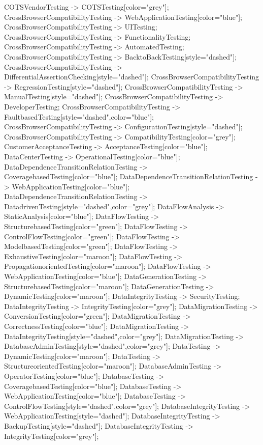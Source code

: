 \documentclass{article}
\begin{document}
{COTSVendorTesting -> COTSTesting[color="grey"];
CrossBrowserCompatibilityTesting -> WebApplicationTesting[color="blue"];
CrossBrowserCompatibilityTesting -> UITesting;
CrossBrowserCompatibilityTesting -> FunctionalityTesting;
CrossBrowserCompatibilityTesting -> AutomatedTesting;
CrossBrowserCompatibilityTesting -> BacktoBackTesting[style="dashed"];
CrossBrowserCompatibilityTesting -> DifferentialAssertionChecking[style="dashed"];
CrossBrowserCompatibilityTesting -> RegressionTesting[style="dashed"];
CrossBrowserCompatibilityTesting -> ManualTesting[style="dashed"];
CrossBrowserCompatibilityTesting -> DeveloperTesting;
CrossBrowserCompatibilityTesting -> FaultbasedTesting[style="dashed",color="blue"];
CrossBrowserCompatibilityTesting -> ConfigurationTesting[style="dashed"];
CrossBrowserCompatibilityTesting -> CompatibilityTesting[color="grey"];
CustomerAcceptanceTesting -> AcceptanceTesting[color="blue"];
DataCenterTesting -> OperationalTesting[color="blue"];
DataDependenceTransitionRelationTesting -> CoveragebasedTesting[color="blue"];
DataDependenceTransitionRelationTesting -> WebApplicationTesting[color="blue"];
DataDependenceTransitionRelationTesting -> DatadrivenTesting[style="dashed",color="grey"];
DataFlowAnalysis -> StaticAnalysis[color="blue"];
DataFlowTesting -> StructurebasedTesting[color="green"];
DataFlowTesting -> ControlFlowTesting[color="green"];
DataFlowTesting -> ModelbasedTesting[color="green"];
DataFlowTesting -> ExhaustiveTesting[color="maroon"];
DataFlowTesting -> PropagationorientedTesting[color="maroon"];
DataFlowTesting -> WebApplicationTesting[color="blue"];
DataGenerationTesting -> StructurebasedTesting[color="maroon"];
DataGenerationTesting -> DynamicTesting[color="maroon"];
DataIntegrityTesting -> SecurityTesting;
DataIntegrityTesting -> IntegrityTesting[color="grey"];
DataMigrationTesting -> ConversionTesting[color="green"];
DataMigrationTesting -> CorrectnessTesting[color="blue"];
DataMigrationTesting -> DataIntegrityTesting[style="dashed",color="grey"];
DataMigrationTesting -> DatabaseAdminTesting[style="dashed",color="grey"];
DataTesting -> DynamicTesting[color="maroon"];
DataTesting -> StructureorientedTesting[color="maroon"];
DatabaseAdminTesting -> OperatorTesting[color="blue"];
DatabaseTesting -> CoveragebasedTesting[color="blue"];
DatabaseTesting -> WebApplicationTesting[color="blue"];
DatabaseTesting -> ControlFlowTesting[style="dashed",color="grey"];
DatabaseIntegrityTesting -> WebApplicationTesting[style="dashed"];
DatabaseIntegrityTesting -> BackupTesting[style="dashed"];
DatabaseIntegrityTesting -> IntegrityTesting[color="grey"];
}
\end{document}
